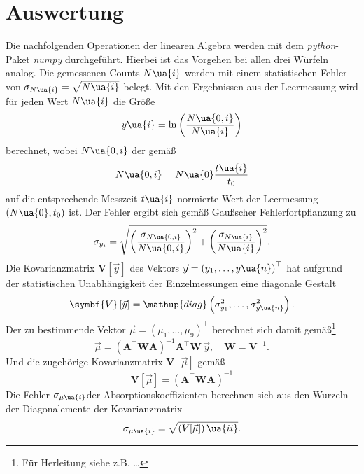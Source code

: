 \section{Auswertung}
Die nachfolgenden Operationen der linearen Algebra werden mit dem \emph{python}-Paket
\emph{numpy}\cite{} durchgeführt. Hierbei ist das Vorgehen bei allen drei Würfeln
analog. Die gemessenen Counts $N\ua{i}$ werden mit einem statistischen Fehler
von $\sigma_{N\ua{i}} = \sqrt{N\ua{i}}$ belegt. Mit den Ergebnissen aus
der Leermessung wird für jeden Wert $N\ua{i}$ die Größe
\begin{equation}
  y\ua{i} = \ln\left(\frac{N\ua{0, i}}{N\ua{i}} \right)
  \label{eq: y}
\end{equation}
berechnet, wobei $N\ua{0, i}$ der gemäß
\begin{equation}
  N\ua{0, i} = N\ua{0} \frac{t\ua{i}}{t_0}
  \label{eq: count_skalierung}
\end{equation}
auf die entsprechende Messzeit $t\ua{i}$ normierte Wert der Leermessung $(N\ua{0}, t_0)$ ist.
Der Fehler ergibt sich gemäß Gaußscher Fehlerfortpflanzung zu
\begin{equation}
  \sigma_{y_i} = \sqrt{\left(\frac{\sigma_{N\ua{0, i}}}{N\ua{0, i}} \right)^2 +    \left(\frac{\sigma_{N\ua{i}}}{N\ua{i}} \right)^2}.
\end{equation}
Die Kovarianzmatrix $\symbf{V}\left[\vec{y}\right]$ des Vektors $\vec{y} = \left(y_1, \dots , y\ua{n} \right)^\top$ hat aufgrund der statistischen Unabhängigkeit der
Einzelmessungen eine diagonale Gestalt
\begin{equation}
  \symbf{V}\left[\vec{y}\right] = \mathup{diag}\left(\sigma_{y_1}^2, \dots , \sigma_{y\ua{n}}^2 \right).
\end{equation}
Der zu bestimmende Vektor $\vec{\mu} = \left(\mu_1, \dots , \mu_9 \right)^\top$ berechnet sich damit gemäß\footnote{Für Herleitung siehe z.B. \dots}
\begin{equation}
  \vec{\mu} = \left(\symbf{A}^\top \symbf{W} \symbf{A}\right)^{-1}  \symbf{A}^\top \symbf{W} \, \vec{y}, \quad \symbf{W} = \symbf{V}^{-1}.
\end{equation}
Und die zugehörige Kovarianzmatrix $\symbf{V}[\vec{\mu}]$ gemäß
\begin{equation}
  \symbf{V}\left[\vec{\mu}\right] = \left( \symbf{A}^\top \symbf{W}  \symbf{A}\right)^{-1}
\end{equation}
Die Fehler $\sigma_{\mu\ua{i}}$der Absorptionskoeffizienten berechnen sich aus den Wurzeln der Diagonalemente der Kovarianzmatrix
\begin{equation}
 \sigma_{\mu\ua{i}} = \sqrt{\left(V[\vec{\mu}]\right)\ua{ii}}.
\end{equation}





